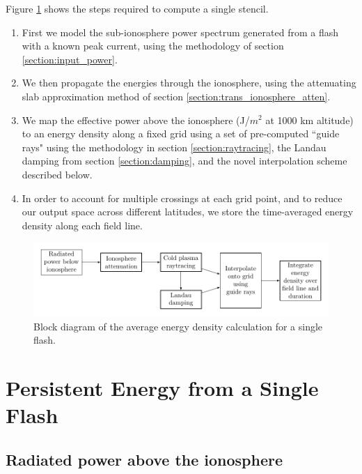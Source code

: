Figure \ref{fig:power_blockdiagram} shows the steps required to compute a single stencil. 
\begin{enumerate}
\item{First we model the sub-ionosphere power spectrum generated from a flash with a known peak current, using the methodology of section \ref{section:input_power}.}
\item{We then propagate the energies through the ionosphere, using the attenuating slab approximation method of section \ref{section:trans_ionosphere_atten}.}
\item{We map the effective power above the ionosphere (J/$m^2$ at 1000 km altitude) to an energy density along a fixed grid using a set of pre-computed ``guide rays" using the methodology in section \ref{section:raytracing}, the Landau damping from section \ref{section:damping}, and the novel interpolation scheme described below.}
\item{In order to account for multiple crossings at each grid point, and to reduce our output space across different latitudes, we store the time-averaged energy density along each field line.}
 \end{enumerate}
\begin{figure}
\begin{center}
\includegraphics[width=\textwidth]{figures/lightning_power_block_diagram.pdf}



\caption[Energy density calculation block diagram]{Block diagram of the average energy density calculation for a single flash.}
\label{fig:power_blockdiagram}
\end{center}
\end{figure}



\section{Persistent Energy from a Single Flash}

\subsection{Radiated power above the ionosphere}







